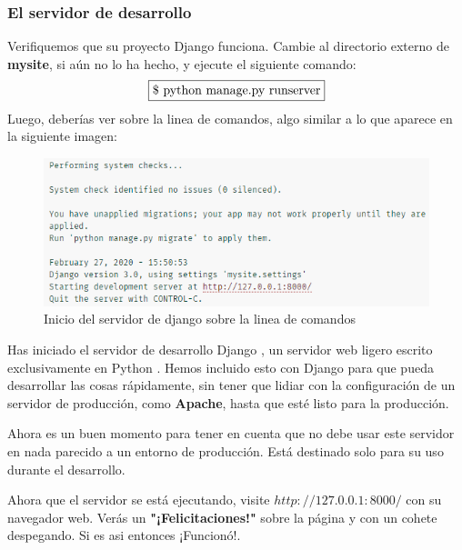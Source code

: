 \documentclass[10pt]{article}
\newcommand{\py}[1]{{\textcolor{B}{Python} #1}}
\newcommand{\django}[1]{{\textcolor{G}{Django} #1}}
\begin{document}
\subsubsection{El servidor de desarrollo}

Verifiquemos que su proyecto \django{} funciona. Cambie al directorio externo de \textbf{mysite}, si aún no lo ha hecho, y ejecute el siguiente comando:
$$
\fbox{\$ python manage.py runserver}
$$
Luego, deberías ver sobre la linea de comandos, algo similar a lo que aparece en la siguiente imagen:

\begin{figure}[H]
  \begin{center}
  	 \includegraphics{figuras/312/img1.png}	 
	 \renewcommand{\arraystretch}{1.3}
	 \caption{Inicio del servidor de django sobre la linea de comandos}
  \end{center}
\end{figure}

Has iniciado el servidor de desarrollo \django{}, un servidor web ligero escrito exclusivamente en \py{}. Hemos incluido esto con \django{} para que pueda desarrollar las cosas rápidamente, sin tener que lidiar con la configuración de un servidor de producción, como \textbf{Apache}, hasta que esté listo para la producción.


Ahora es un buen momento para tener en cuenta que no debe usar este servidor en nada parecido a un entorno de producción. Está destinado solo para su uso durante el desarrollo. 

Ahora que el servidor se está ejecutando, visite $http://127.0.0.1:8000/$ con su navegador web. Verás un \textbf{"¡Felicitaciones!"} sobre la página y con un cohete despegando. Si es asi entonces ¡Funcionó!.
\end{document}
